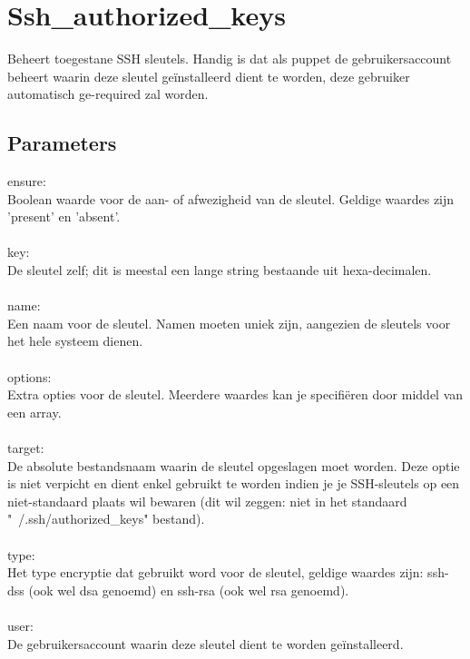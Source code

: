 \section{Ssh\_authorized\_keys}

Beheert toegestane SSH sleutels. Handig is dat als puppet de gebruikersaccount beheert waarin deze sleutel ge\"installeerd dient te worden, deze gebruiker automatisch ge-required zal worden.

\subsection{Parameters}

ensure:\\
Boolean waarde voor de aan- of afwezigheid van de sleutel. Geldige waardes zijn 'present' en 'absent'.\\\\
%
key:\\
De sleutel zelf; dit is meestal een lange string bestaande uit hexa-decimalen.\\\\
%
name:\\
Een naam voor de sleutel. Namen moeten uniek zijn, aangezien de sleutels voor het hele systeem dienen.\\\\
%
options:\\
Extra opties voor de sleutel. Meerdere waardes kan je specifi\"eren door middel van een array.\\\\
%
target:\\
De absolute bestandsnaam waarin de sleutel opgeslagen moet worden. Deze optie is niet verpicht en dient enkel gebruikt te worden indien je je SSH-sleutels op een niet-standaard plaats wil bewaren (dit wil zeggen: niet in het standaard "~/.ssh/authorized\_keys" bestand).\\\\
%
type:\\
Het type encryptie dat gebruikt word voor de sleutel, geldige waardes zijn: ssh-dss (ook wel dsa genoemd) en ssh-rsa (ook wel rsa genoemd).\\\\
%
user:\\
De gebruikersaccount waarin deze sleutel dient te worden ge\"installeerd.\\\\
